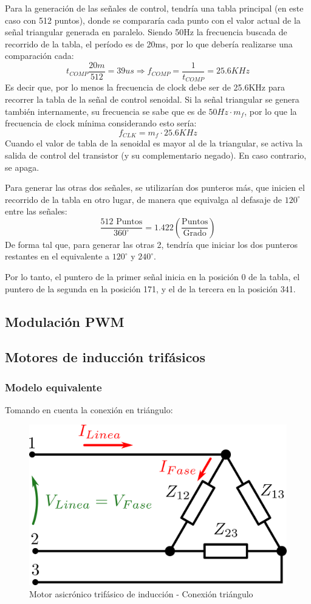 \documentclass[e4_tp3_main.tex]{subfiles}
\begin{document}
Para la generación de las señales de control, tendría una tabla principal (en este caso con 512 puntos), donde se compararía cada punto con el valor actual de la señal triangular generada en paralelo. Siendo 50Hz la frecuencia buscada de recorrido de la tabla, el período es de 20ms, por lo que debería realizarse una comparación cada:
\[
t_{COMP}\frac{20m}{512} = 39us \Longrightarrow f_{COMP} = \frac{1}{t_{COMP}} = 25.6KHz 
\]
Es decir que, por lo menos la frecuencia de clock debe ser de 25.6KHz para recorrer la tabla de la señal de control senoidal. Si la señal triangular se genera también internamente, su frecuencia se sabe que es de $50Hz\cdot m_f$, por lo que la frecuencia de clock mínima considerando esto sería:
\[
f_{CLK} = m_f \cdot 25.6KHz
\]
Cuando el valor de tabla de la senoidal es mayor al de la triangular, se activa la salida de control del transistor (y su complementario negado). En caso contrario, se apaga.\par
Para generar las otras dos señales, se utilizarían dos punteros más, que inicien el recorrido de la tabla en otro lugar, de manera que equivalga al defasaje de $120^{\circ}$ entre las señales:
\[
\frac{512 \textrm{ Puntos}}{360^{\circ}} = 1.422 \left( \frac{\textrm{Puntos}}{\textrm{Grado}} \right)
\]
De forma tal que, para generar las otras 2, tendría que iniciar los dos punteros restantes en el equivalente a $120^{\circ}$ y $240^{\circ}$.\par
Por lo tanto, el puntero de la primer señal inicia en la posición 0 de la tabla, el puntero de la segunda en la posición 171, y el de la tercera en la posición 341. 

\newpage

\subsection{Modulación PWM}

\subsection{Motores de inducción trifásicos}

\subsubsection{Modelo equivalente}

Tomando en cuenta la conexión en triángulo:

\begin{figure}[H]
\centering
\includegraphics[width=0.6\linewidth]{Imagenes/motorParte2.png}
\caption{Motor asicrónico trifásico de inducción - Conexión triángulo}
\end{figure}
\end{document}
